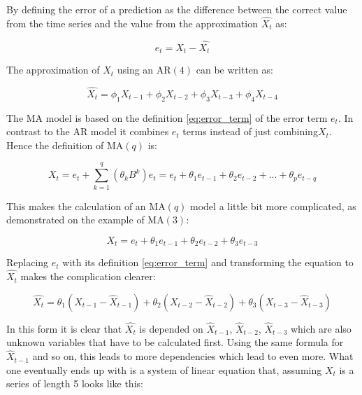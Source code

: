 By defining the error of a prediction as the difference between the correct value from the time series and the value from the approximation \(\hat{X_t}\) as: 

\begin{equation}\label{eq:error_term}
e_t = X_t - \hat{X_t}
\end{equation}

The approximation of \(X_t\) using an \acs{AR}\((4)\) can be written as:

\begin{equation}\label{eq:AR_four}
\hat{X_t} = \phi_1 X_{t-1}+ \phi_2 X_{t-2}+ \phi_3 X_{t-3}+ \phi_4 X_{t-4}
\end{equation}

The \acl{MA} model is based on the definition \eqref{eq:error_term} of the error term \(e_t\). In contrast to the \acs{AR} model it combines \(e_t\) terms instead of just combining\(X_t\). Hence the definition of \acs{MA}\((q)\) is:

\begin{equation}\label{eq:MA_q}
X_t = e_t + \displaystyle\sum_{k=1}^{q} (\theta_k B^k) e_t = e_t + \theta_1 e_{t-1}+ \theta_2 e_{t-2}+ ... + \theta_p e_{t-q}
\end{equation}

This makes the calculation of an \acs{MA}\((q)\) model a little bit more complicated, as demonstrated on the example of \acs{MA}\((3)\):

\begin{equation}\label{eq:example_MA_three_1}
X_t = e_t + \theta_1 e_{t-1}+ \theta_2 e_{t-2} + \theta_3 e_{t-3}
\end{equation}

Replacing \(e_t\) with its definition \eqref{eq:error_term} and transforming the equation to \(\hat{X_t}\) makes the complication clearer:

\begin{equation}\label{eq:example_MA_three_2}
\hat{X_t} =\theta_1 (X_{t-1} - {\hat{X}}_{t-1}) + \theta_2 (X_{t-2} - {\hat{X}}_{t-2}) + \theta_3 (X_{t-3} - {\hat{X}}_{t-3})
\end{equation}

In this form it is clear that \(\hat{X_t}\) is depended on \({\hat{X}}_{t-1}\), \({\hat{X}}_{t-2}\), \({\hat{X}}_{t-3}\) which are also unknown variables that have to be calculated first. Using the same formula for \({\hat{X}}_{t-1}\) and so on, this leads to more dependencies which lead to even more. What one eventually ends up with is a system of linear equation that, assuming \(X_t\) is a series of length 5 looks like this: 

